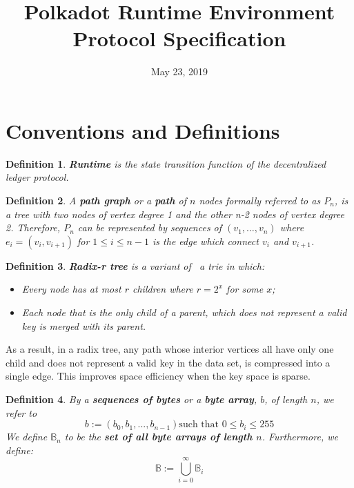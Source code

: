 \documentclass{article}
\newcommand{\assign}{:=}
\newcommand{\tmstrong}[1]{\textbf{#1}}
\newcommand{\tmtextbf}[1]{{\bfseries{#1}}}
\newcommand{\tmtexttt}[1]{{\ttfamily{#1}}}
\newcommand{\tmverbatim}[1]{{\ttfamily{#1}}}
\newtheorem{definition}{Definition}
\providecommand{\tmstrong}[1]{\tmtextbf{#1}}
\providecommand{\tmtextbf}[1]{\tmtextbf{#1}}
\providecommand{\tmverbatim}[1]{\tmtexttt{#1}}
\newtheorem{definition}{Definition}
\begin{document}
\title{
  Polkadot Runtime Environment\\
  {\Large Protocol Specification}
}

\date{May 23, 2019}

\maketitle

\section{Conventions and Definitions}

\begin{definition}
  \label{defn-runtime}{\tmstrong{Runtime}} is the state transition function of
  the decentralized ledger protocol.\tmverbatim{}
\end{definition}

\begin{definition}
  \label{defn-path-graph}A {\tmstrong{path graph}} or a {\tmstrong{path}} of
  $n$ nodes formally referred to as {\tmstrong{$P_n$}}, is a tree with two
  nodes of vertex degree 1 and the other n-2 nodes of vertex degree 2.
  Therefore, $P_n$ can be represented by sequences of $(v_1, \ldots, v_n)$
  where $e_i = (v_i, v_{i + 1})$ for $1 \leqslant i \leqslant n - 1$ is the
  edge which connect $v_i$ and $v_{i + 1}$.
\end{definition}

\begin{definition}
  \label{defn-radix-tree}{\tmstrong{Radix-r tree}} is a variant of \ a trie in
  which:
  \begin{itemize}
    \item Every node has at most $r$ children where $r = 2^x$ for some $x$;
    
    \item Each node that is the only child of a parent, which does not
    represent a valid key is merged with its parent.
  \end{itemize}
\end{definition}

As a result, in a radix tree, any path whose interior vertices all have only
one child and does not represent a valid key in the data set, is compressed
into a single edge. This improves space efficiency when the key space is
sparse.

\begin{definition}
  By a {\tmstrong{sequences of bytes}} or a {\tmstrong{byte array}}, $b$, of
  length $n$, we refer to
  \[ b \assign (b_0, b_1, ..., b_{n - 1})  \text{such that } 0 \leqslant b_i
     \leqslant 255 \]
  We define $\mathbb{B}_n$ to be the {\tmstrong{set of all byte arrays of
  length $n$}}. Furthermore, we define:
  \[ \mathbb{B} \assign \bigcup^{\infty}_{i = 0} \mathbb{B}_i \]
\end{definition}
\end{document}
